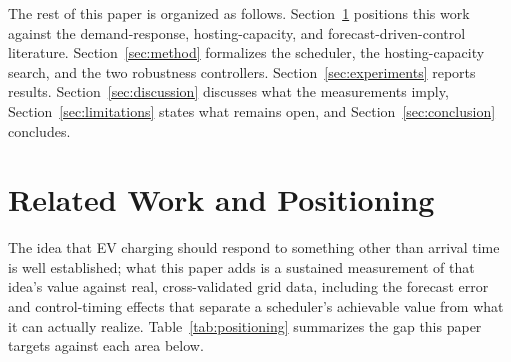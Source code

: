 \documentclass[journal]{IEEEtran}
\begin{document}
The rest of this paper is organized as follows. Section~\ref{sec:related} positions this work against the demand-response, hosting-capacity, and forecast-driven-control literature. Section~\ref{sec:method} formalizes the scheduler, the hosting-capacity search, and the two robustness controllers. Section~\ref{sec:experiments} reports results. Section~\ref{sec:discussion} discusses what the measurements imply, Section~\ref{sec:limitations} states what remains open, and Section~\ref{sec:conclusion} concludes.

\section{Related Work and Positioning}
\label{sec:related}

The idea that EV charging should respond to something other than arrival time is well established; what this paper adds is a sustained measurement of that idea's value against real, cross-validated grid data, including the forecast error and control-timing effects that separate a scheduler's achievable value from what it can actually realize. Table~\ref{tab:positioning} summarizes the gap this paper targets against each area below.
\end{document}
